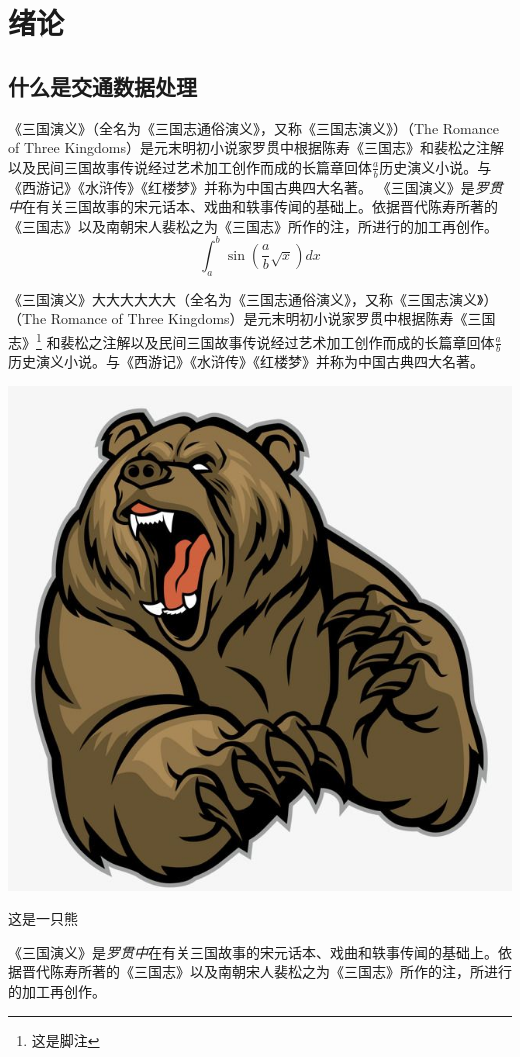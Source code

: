 \chapter{绪论}

\section{什么是交通数据处理}

《三国演义》（全名为《三国志通俗演义》，又称《三国志演义》）（The Romance of Three Kingdoms）是元末明初小说家罗贯中根据陈寿《三国志》和裴松之注解以及民间三国故事传说经过艺术加工创作而成的长篇章回体$\frac{a}{b}$历史演义小说。与《西游记》《水浒传》《红楼梦》并称为中国古典四大名著。
《三国演义》是\emph{罗贯中}在有关{\sffamily 三国故事的宋元话本}、戏曲和轶事传闻的基础上。依据晋代陈寿所著的《三国志》以及南朝宋人裴松之为《三国志》所作的注，所进行的加工再创作。
\begin{equation}
    \int_a^b\sin(\frac{a}{b}\sqrt{x})dx
\end{equation}

《三国演义》大大大大大大（全名为《三国志通俗演义》，又称《三国志演义》）（The Romance of Three Kingdoms）是元末明初小说家罗贯中根据陈寿《三国志》\footnote{这是脚注}%
和裴松之注解以及民间三国故事传说经过艺术加工创作而成的长篇章回体$\frac{a}{b}$历史演义小说。与《西游记》《水浒传》《红楼梦》并称为中国古典四大名著。
\begin{marginfigure}[1.5cm]
\includegraphics[width=\linewidth]{images/bear.jpeg}
\caption{这是一只熊}
\end{marginfigure}
《三国演义》是\emph{罗贯中}在有关{\sffamily 三国故事的宋元话本}、戏曲和轶事传闻的基础上。依据晋代陈寿所著的《三国志》以及南朝宋人裴松之为《三国志》所作的注，所进行的加工再创作。

